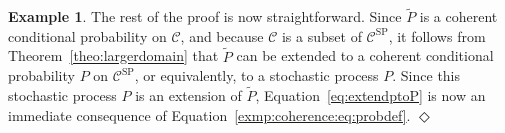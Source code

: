 \documentclass[10pt,a4paper]{paper}
\theoremstyle{definition}
\newtheorem{exmp}{Example}%
\newtheorem{proposition}[theorem]{Proposition}
\newcommand{\reals}{\mathbb{R}}
\newcommand{\realspos}{\reals_{>0}}
\newcommand{\realsnonneg}{\reals_{\geq 0}}
\newcommand{\states}{\mathcal{X}}
\newcommand{\paths}{\Omega}
\newcommand{\power}{\mathcal{P}(\paths)}
\newcommand{\nonemptypower}{\power_{\emptyset}}
\newcommand{\processes}{\mathbb{P}}
\newcommand{\coloneqq}{:\!=}
\newcommand{\exampleend}{\hfill$\Diamond$}
\begin{document}
\begin{exmp}
The rest of the proof is now straightforward. Since $\tilde{P}$ is a coherent conditional probability on $\mathcal{C}$, and because $\mathcal{C}$ is a subset of $\mathcal{C}^{\mathrm{SP}}$, it follows from Theorem~\ref{theo:largerdomain} that $\tilde{P}$ can be extended to a coherent conditional probability $P$ on $\mathcal{C}^{\mathrm{SP}}$, or equivalently, to a stochastic process $P$. Since this stochastic process $P$ is an extension of $\tilde{P}$, Equation~\eqref{eq:extendptoP} is now an immediate consequence of Equation~\eqref{exmp:coherence:eq:probdef}.
\exampleend
\end{exmp}


%
%
%
\end{document}
